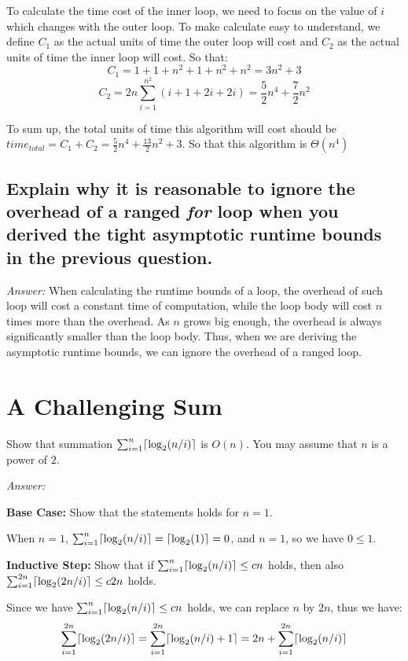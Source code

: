 \documentclass[11pt]{article}
\DeclarePairedDelimiter{\ceil}{\lceil}{\rceil}
\begin{document}
	To calculate the time cost of the inner loop, we need to focus on the value of $i$ which changes with the outer loop. To make calculate easy to understand, we define $C_1$ as the actual units of time the outer loop will cost and $C_2$ as the actual units of time the inner loop will cost. So that:
	\begin{equation*}
		C_1=1+1+n^2+1+n^2+n^2 = 3n^2+3
	\end{equation*}
	\begin{equation*}
		C_2=2n\sum_{i=1}^{n^2} (i+1+2i+2i)=\frac{5}{2} n^4 + \frac{7}{2} n^2
	\end{equation*}
	
	To sum up, the total units of time this algorithm will cost should be $time_{total} = C_1 + C_2 = \frac{5}{2}n^4+\frac{13}{2}n^2+3$. So that this algorithm is $\Theta(n^4)$
\subsection{Explain why it is reasonable to ignore the overhead of a ranged \emph{for} loop when you derived the tight asymptotic runtime bounds in the previous question.}
	\emph{Answer:} When calculating the runtime bounds of a loop, the overhead of such loop will cost a constant time of computation, while the loop body will cost $n$ times more than the overhead. As $n$ grows big enough, the overhead is always significantly smaller than the loop body. Thus, when we are deriving the asymptotic runtime bounds, we can ignore the overhead of a ranged loop.
\section{A Challenging Sum}
	Show that summation $\sum_{i=1}^{n} \ceil{\log_2(n/i)}$ is $O(n)$. You may assume that $n$ is a power of $2$.
	
	\emph{Answer:}
	
	\textbf{Base Case:} Show that the statements holds for $n=1$.
	
	When $n=1$, $\sum_{i=1}^{n} \ceil{\log_2(n/i)}=\ceil{\log_2(1)}=0$, and $n=1$, so we have $0\leq1$.
	
	\textbf{Inductive Step:} Show that if $\sum_{i=1}^{n} \ceil{\log_2(n/i)}\leq cn$ holds, then also $\sum_{i=1}^{2n} \ceil{\log_2(2n/i)}\leq c2n$ holds.
	
	Since we have $\sum_{i=1}^{n} \ceil{\log_2(n/i)}\leq cn$ holds, we can replace $n$ by $2n$, thus we have:
	\begin{equation*}
		\sum_{i=1}^{2n} \ceil{\log_2(2n/i)} = \sum_{i=1}^{2n} \ceil{\log_2(n/i)+1}=2n+\sum_{i=1}^{2n}\ceil{\log_2(n/i)}
	\end{equation*}
	
\end{document}
